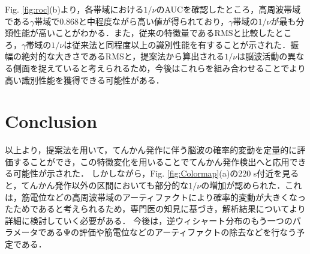 \documentclass[journal]{IEEEtran}
\begin{document}
Fig. \ref{fig:roc}(b)より，各帯域における$1/\nu$のAUCを確認したところ，高周波帯域である$\gamma$帯域で0.868と中程度ながら高い値が得られており，$\gamma$帯域の$1/\nu$が最も分類性能が高いことがわかる．また，従来の特徴量であるRMSと比較したところ，$\gamma$帯域の$1/\nu$は従来法と同程度以上の識別性能を有することが示された．振幅の絶対的な大きさであるRMSと，提案法から算出される$1/\nu$は脳波活動の異なる側面を捉えていると考えられるため，今後はこれらを組み合わせることでより高い識別性能を獲得できる可能性がある．

\section{Conclusion}
以上より，提案法を用いて，てんかん発作に伴う脳波の確率的変動を定量的に評価することができ，この特徴変化を用いることでてんかん発作検出へと応用できる可能性が示された．
しかしながら，Fig. \ref{fig:Colormap}(a)の220 s付近を見ると，てんかん発作以外の区間においても部分的な$1/\nu$の増加が認められた．これは，筋電位などの高周波帯域のアーティファクトにより確率的変動が大きくなったためであると考えられるため，専門医の知見に基づき，解析結果についてより詳細に検討していく必要がある．
今後は，逆ウィシャート分布のもう一つのパラメータである$\mathbf{\Psi}$の評価や筋電位などのアーティファクトの除去などを行なう予定である．
\end{document}
